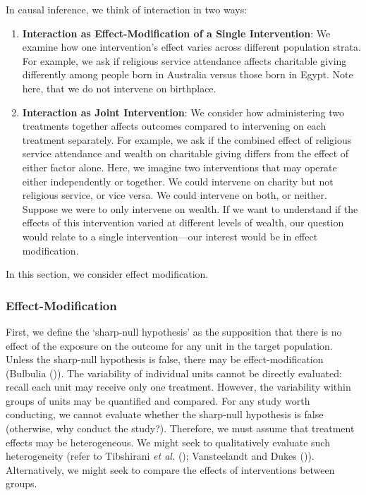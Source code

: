 \documentclass[
  single column]{article}
\begin{document}
In causal inference, we think of interaction in two ways:

\begin{enumerate}
\def\labelenumi{\arabic{enumi}.}
\item
  \textbf{Interaction as Effect-Modification of a Single Intervention}:
  We examine how one intervention's effect varies across different
  population strata. For example, we ask if religious service attendance
  affects charitable giving differently among people born in Australia
  versus those born in Egypt. Note here, that we do not intervene on
  birthplace.
\item
  \textbf{Interaction as Joint Intervention}: We consider how
  administering two treatments together affects outcomes compared to
  intervening on each treatment separately. For example, we ask if the
  combined effect of religious service attendance and wealth on
  charitable giving differs from the effect of either factor alone.
  Here, we imagine two interventions that may operate either
  independently or together. We could intervene on charity but not
  religious service, or vice versa. We could intervene on both, or
  neither. Suppose we were to only intervene on wealth. If we want to
  understand if the effects of this intervention varied at different
  levels of wealth, our question would relate to a single
  intervention---our interest would be in effect modification.
\end{enumerate}

In this section, we consider effect modification.

\subsubsection{Effect-Modification}\label{effect-modification}

First, we define the `sharp-null hypothesis' as the supposition that
there is no effect of the exposure on the outcome for any unit in the
target population. Unless the sharp-null hypothesis is false, there may
be effect-modification (Bulbulia
()). The variability of individual
units cannot be directly evaluated: recall each unit may receive only
one treatment. However, the variability within groups of units may be
quantified and compared. For any study worth conducting, we cannot
evaluate whether the sharp-null hypothesis is false (otherwise, why
conduct the study?). Therefore, we must assume that treatment effects
may be heterogeneous. We might seek to qualitatively evaluate such
heterogeneity (refer to Tibshirani \emph{et al.}
(); Vansteelandt and Dukes
()). Alternatively, we might seek
to compare the effects of interventions between groups.
\end{document}
